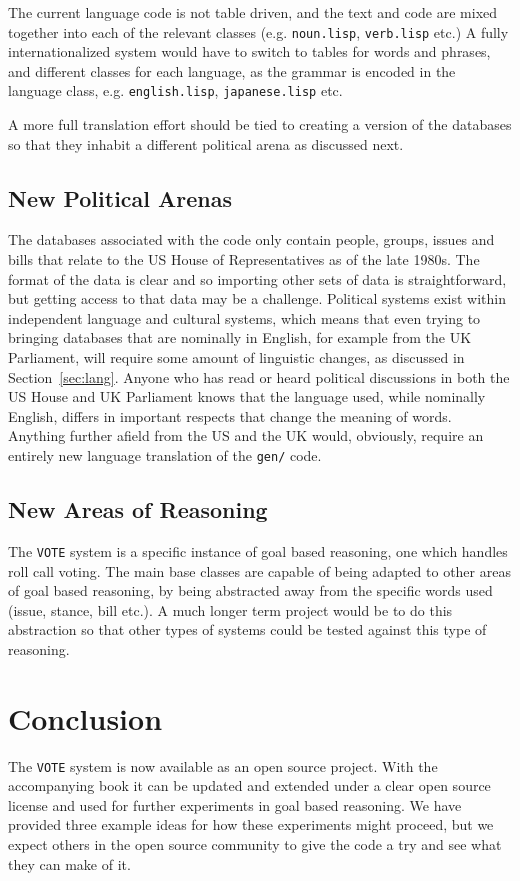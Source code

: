 \documentclass[10pt]{article}
\begin{document}
The current language code is not table driven, and the text and code
are mixed together into each of the relevant classes
(e.g. \verb|noun.lisp|, \verb|verb.lisp| etc.) A fully
internationalized system would have to switch to tables for words and
phrases, and different classes for each language, as the grammar is
encoded in the language class, e.g. \verb|english.lisp|,
\verb|japanese.lisp| etc.

A more full translation effort should be tied to creating a version of
the databases so that they inhabit a different political arena as
discussed next.

\subsection{New Political Arenas}
\label{sec:arenas}

The databases associated with the code only contain people, groups,
issues and bills that relate to the US House of Representatives as of
the late 1980s.  The format of the data is clear and so importing
other sets of data is straightforward, but getting access to that data
may be a challenge.  Political systems exist within independent
language and cultural systems, which means that even trying to bringing
databases that are nominally in English, for example from the UK
Parliament, will require some amount of linguistic changes, as
discussed in Section~\ref{sec:lang}.  Anyone who has read or heard
political discussions in both the US House and UK Parliament knows
that the language used, while nominally English, differs in important
respects that change the meaning of words.  Anything further afield
from the US and the UK would, obviously, require an entirely new
language translation of the \verb|gen/| code.

\subsection{New Areas of Reasoning}
\label{sec:reasoning}

The \verb|VOTE| system is a specific instance of goal based reasoning,
one which handles roll call voting.  The main base classes are capable
of being adapted to other areas of goal based reasoning, by being
abstracted away from the specific words used (issue, stance, bill
etc.).  A much longer term project would be to do this abstraction so
that other types of systems could be tested against this type of reasoning.

\section{Conclusion}

The \verb|VOTE| system is now available as an open source project.
With the accompanying book it can be updated and extended under a
clear open source license and used for further experiments in goal
based reasoning.  We have provided three example ideas for how these
experiments might proceed, but we expect others in the open source
community to give the code a try and see what they can make of it.

\footnotesize{


}
\end{document}
